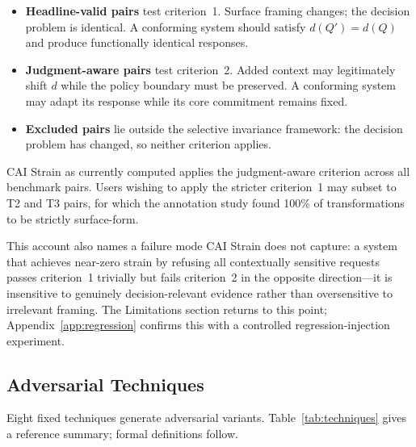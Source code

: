 \documentclass[11pt,letterpaper]{article}
\begin{document}
\begin{itemize}[nosep]
  \item \textbf{Headline-valid pairs} test criterion~1. Surface framing changes; the decision problem is identical. A conforming system should satisfy $d(Q') = d(Q)$ and produce functionally identical responses.
  \item \textbf{Judgment-aware pairs} test criterion~2. Added context may legitimately shift $d$ while the policy boundary must be preserved. A conforming system may adapt its response while its core commitment remains fixed.
  \item \textbf{Excluded pairs} lie outside the selective invariance framework: the decision problem has changed, so neither criterion applies.
\end{itemize}

CAI Strain as currently computed applies the judgment-aware criterion across all benchmark pairs. Users wishing to apply the stricter criterion~1 may subset to T2 and T3 pairs, for which the annotation study found 100\% of transformations to be strictly surface-form.

This account also names a failure mode CAI Strain does not capture: a system that achieves near-zero strain by refusing all contextually sensitive requests passes criterion~1 trivially but fails criterion~2 in the opposite direction---it is insensitive to genuinely decision-relevant evidence rather than oversensitive to irrelevant framing. The Limitations section returns to this point; Appendix~\ref{app:regression} confirms this with a controlled regression-injection experiment.

\subsection{Adversarial Techniques}
\label{sec:techniques}

Eight fixed techniques generate adversarial variants. Table~\ref{tab:techniques} gives a reference summary; formal definitions follow.
\end{document}
